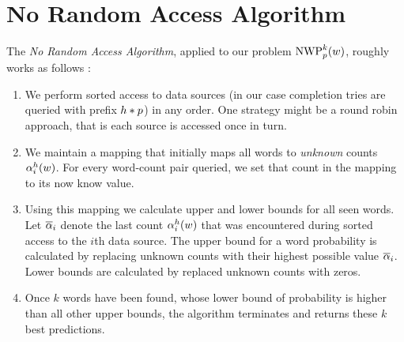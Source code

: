 \section{No Random Access Algorithm}
\label{sec:norandomaccessalgorithm}

The \emph{No Random Access Algorithm}, applied to our problem $\NWP[p][k](w)$,
roughly works as follows \parencite{Fagin2001}:
\begin{enumerate}
  \item We perform sorted access to data sources (in our case completion tries
    are queried with prefix $h * p$) in any order.
    One strategy might be a round robin approach, that is each source is
    accessed once in turn.
  \item We maintain a mapping that initially maps all words to \emph{unknown}
    counts $\alpha^h_i(w)$.
    For every word-count pair queried, we set that count in the mapping to its
    now know value.
  \item Using this mapping we calculate upper and lower bounds for all seen
    words.
    Let $\overline{\alpha}_i$ denote the last count $\alpha^h_i(w)$ that
    was encountered during sorted access to the $i$th data source.
    The upper bound for a word probability is calculated by replacing unknown
    counts with their highest possible value $\overline{\alpha}_i$.
    Lower bounds are calculated by replaced unknown counts with zeros.
  \item Once $k$ words have been found, whose lower bound of probability is
    higher than all other upper bounds, the algorithm terminates and returns
    these $k$ best predictions.
\end{enumerate}

